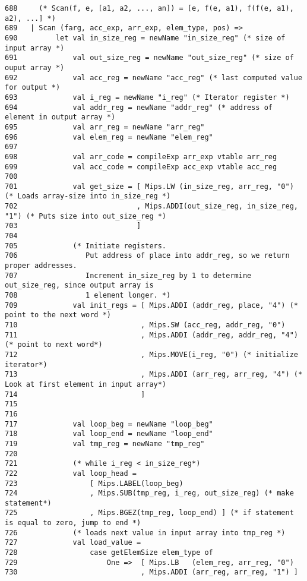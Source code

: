 \documentclass[paper=a4, fontsize=11pt]{scrartcl} %
\numberwithin{equation}{section} %
\numberwithin{figure}{section} %
\numberwithin{table}{section} %
\begin{document}
\begin{lstlisting}
688	    (* Scan(f, e, [a1, a2, ..., an]) = [e, f(e, a1), f(f(e, a1), a2), ...] *)
689	  | Scan (farg, acc_exp, arr_exp, elem_type, pos) => 
690	        let val in_size_reg = newName "in_size_reg" (* size of input array *) 
691	            val out_size_reg = newName "out_size_reg" (* size of ouput array *) 
692	            val acc_reg = newName "acc_reg" (* last computed value for output *) 
693	            val i_reg = newName "i_reg" (* Iterator register *) 
694	            val addr_reg = newName "addr_reg" (* address of element in output array *)  
695	            val arr_reg = newName "arr_reg" 
696	            val elem_reg = newName "elem_reg" 
697	 
698	            val arr_code = compileExp arr_exp vtable arr_reg 
699	            val acc_code = compileExp acc_exp vtable acc_reg 
700	             
701	            val get_size = [ Mips.LW (in_size_reg, arr_reg, "0") (* Loads array-size into in_size_reg *) 
702	                           , Mips.ADDI(out_size_reg, in_size_reg, "1") (* Puts size into out_size_reg *) 
703	                           ]  
704	 
705	            (* Initiate registers. 
706	               Put address of place into addr_reg, so we return proper addresses. 
707	               Increment in_size_reg by 1 to determine out_size_reg, since output array is 
708	               1 element longer. *) 
709	            val init_regs = [ Mips.ADDI (addr_reg, place, "4") (* point to the next word *) 
710	                            , Mips.SW (acc_reg, addr_reg, "0") 
711	                            , Mips.ADDI (addr_reg, addr_reg, "4") (* point to next word*) 
712	                            , Mips.MOVE(i_reg, "0") (* initialize iterator*) 
713	                            , Mips.ADDI (arr_reg, arr_reg, "4") (* Look at first element in input array*) 
714	                            ] 
715	  
716	  
717	            val loop_beg = newName "loop_beg" 
718	            val loop_end = newName "loop_end" 
719	            val tmp_reg = newName "tmp_reg" 
720	  
721	            (* while i_reg < in_size_reg*) 
722	            val loop_head = 
723	                [ Mips.LABEL(loop_beg)  
724	                , Mips.SUB(tmp_reg, i_reg, out_size_reg) (* make statement*) 
725	                , Mips.BGEZ(tmp_reg, loop_end) ] (* if statement is equal to zero, jump to end *) 
726	            (* loads next value in input array into tmp_reg *) 
727	            val load_value = 
728	                case getElemSize elem_type of 
729	                    One =>  [ Mips.LB   (elem_reg, arr_reg, "0") 
730	                            , Mips.ADDI (arr_reg, arr_reg, "1") ] 

\end{lstlisting}
\end{document}
